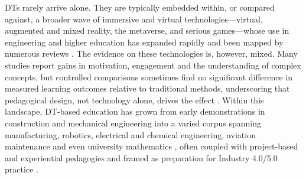 DTs rarely arrive alone. They are typically embedded within, or compared against,
a broader wave of immersive and virtual technologies---virtual, augmented and mixed
reality, the metaverse, and serious games---whose use in engineering and higher
education has expanded rapidly and been mapped by numerous reviews
\cite{lampropoulos_virtual_2025,jin_extended_2026,fan_impacts_2025,espinoza_virtual_2025,llanos-ruiz_virtual_2025}. The evidence on these
technologies is, however, mixed. Many studies report gains in motivation,
engagement and the understanding of complex concepts, but controlled comparisons
sometimes find no significant difference in measured learning outcomes relative
to traditional methods, underscoring that pedagogical design, not technology
alone, drives the effect \cite{giussani_study_2025,yindeemak_emerging_2026,lainidis_systematic_2026}. Within this landscape, DT-based education has
grown from early demonstrations in construction and mechanical engineering
\cite{sepasgozar_digital_2020,liljaniemi_using_2020,treffinger_investigations_2022}
into a varied corpus spanning manufacturing, robotics, electrical and chemical
engineering, aviation maintenance and even university mathematics
\cite{khan_teaching_2026,kwateng_enhancing_2026,hunpinyo_isa95_2026,xiang_research_2025,bolanos_design_2026,lee_digital_2023}, often coupled with
project-based and experiential pedagogies and framed as preparation for
Industry 4.0/5.0 practice \cite{zhang_effectiveness_2024,ruppert_demonstration_2023,terkaj_virtual_2024,alvarez_ariza_investigating_2026}.

